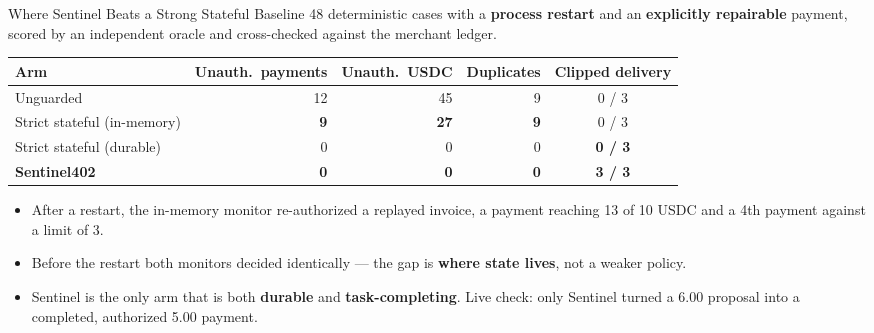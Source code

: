 \documentclass{beamer}
\newcommand{\good}[1]{\textcolor{okgreen}{\textbf{#1}}}
\newcommand{\bad}[1]{\textcolor{maincolor}{\textbf{#1}}}
\begin{document}
\begin{frame}{Where Sentinel Beats a Strong Stateful Baseline}
\footnotesize
48 deterministic cases with a \textbf{process restart} and an
\textbf{explicitly repairable} payment, scored by an independent oracle and
cross-checked against the merchant ledger.

\vspace{2mm}
\begin{center}
\begin{tabular}{@{}lrrrc@{}}
  \toprule
  \textbf{Arm} & \textbf{Unauth.\ payments} & \textbf{Unauth.\ USDC}
    & \textbf{Duplicates} & \textbf{Clipped delivery} \\
  \midrule
  Unguarded                    & 12 & 45 & 9 & 0 / 3 \\
  Strict stateful (in-memory)  & \bad{9} & \bad{27} & \bad{9} & 0 / 3 \\
  Strict stateful (durable)    & 0 & 0 & 0 & \bad{0 / 3} \\
  \textbf{Sentinel402}         & \good{0} & \good{0} & \good{0} & \good{3 / 3} \\
  \bottomrule
\end{tabular}
\end{center}

\vspace{2mm}
\begin{itemize}
  \setlength{\itemsep}{2pt}
  \item After a restart, the in-memory monitor re-authorized a replayed invoice,
        a payment reaching 13 of 10 USDC and a 4th payment against a limit of 3.
  \item Before the restart both monitors decided identically --- the gap is
        \textbf{where state lives}, not a weaker policy.
  \item Sentinel is the only arm that is both \textbf{durable} and
        \textbf{task-completing}. Live check: only Sentinel turned a
        6.00 proposal into a completed, authorized 5.00 payment.
\end{itemize}
\end{frame}
\end{document}
